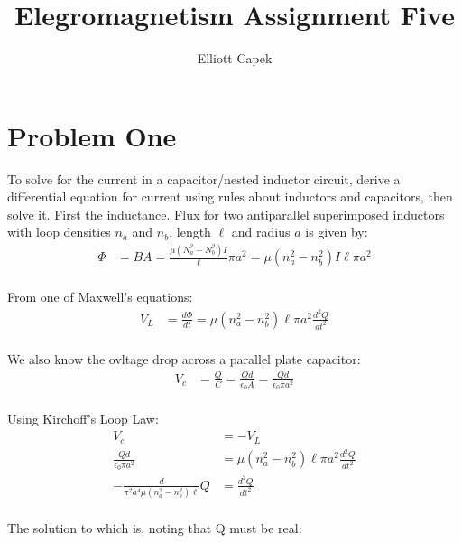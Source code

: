\documentclass[10pt]{article} %
\title{Elegromagnetism Assignment Five}
\author{Elliott Capek}
\begin{document}
\maketitle{}

\section{Problem One}
To solve for the current in a capacitor/nested inductor circuit, derive a differential equation for current using rules about inductors and capacitors, then solve it. First the inductance. Flux for two antiparallel superimposed inductors with loop densities $n_a$ and $n_b$, length $\ell$ and radius $a$ is given by:\\

\begin{align*}
  \Phi &= BA = \frac{\mu \left(N_a^2-N_b^2\right) I}{\ell}\pi a^2 = \mu \left(n_a^2-n_b^2\right)I\ell\pi a^2\\
\end{align*}

From one of Maxwell's equations:\\

\begin{align*}
  V_L &= \frac{d\Phi}{dt} = \mu \left(n_a^2-n_b^2\right)\ell\pi a^2\frac{d^2Q}{dt^2}\\
\end{align*}

We also know the ovltage drop across a parallel plate capacitor:\\

\begin{align*}
  V_c &= \frac{Q}{C} = \frac{Qd}{\epsilon_0 A} = \frac{Qd}{\epsilon_0 \pi a^2}\\
\end{align*}

Using Kirchoff's Loop Law:\\

\begin{align*}
  V_c &= -V_L\\
  \frac{Qd}{\epsilon_0 \pi a^2} &= \mu \left(n_a^2-n_b^2\right)\ell\pi a^2\frac{d^2Q}{dt^2}\\
  -\frac{d}{\pi^2 a^4\mu\left(n_a^2-n_b^2\right)\ell}Q &= \frac{d^2Q}{dt^2}\\
\end{align*}

The solution to which is, noting that Q must be real:\\
\end{document}
